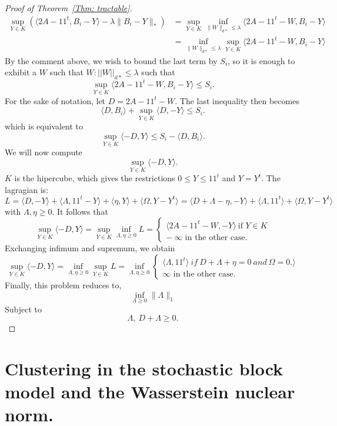 \documentclass[12pt]{amsart}
\theoremstyle{remark}
\begin{document}
\begin{proof}[Proof of Theorem~\ref{Thm: tractable}]
\[
\begin{aligned}
\sup_{Y\in K} \left(\langle 2A-11^t, B_i-Y\rangle -\lambda \|B_i-Y\|_*\right)&=
\sup_{Y\in K} \inf_{ \|W\|_{d*}\leq \lambda} \langle 2A-11^t-W, B_i-Y\rangle \\ 
&=\inf_{ \|W\|_{d*}\leq \lambda}\sup_{Y\in K}\langle 2A-11^t-W, B_i-Y\rangle 
\end{aligned}
\]
By the comment above, we wish to bound the last term by $S_i$, so it is enough to exhibit a $W$ such that $W: ||W||_{d*} \leq \lambda$ such that
\[
\sup_{Y\in K} \langle 2A-11^t-W, B_i-Y\rangle \leq S_i.
\]
For the sake of notation, let 
$D= 2A-11^t-W$.
The last inequality then becomes
\[
\langle D,B_i\rangle + \sup_{Y \in K}\langle D,-Y \rangle \leq S_i.
\]
which is equivalent to 
\[
 \sup_{Y \in K}\langle -D,Y \rangle \leq S_i-\langle D,B_i\rangle.
\]
We will now compute 
\[\sup_{Y \in K}\langle -D,Y \rangle.\]
$K$ is the hipercube, which gives the restrictions $0 \leq Y \leq 11^t$ and $Y=Y^t$. 
The lagragian is: 
\[
L = \langle D,-Y \rangle + \langle \Lambda,11^t-Y \rangle + \langle \eta,Y \rangle + \langle \Omega,Y-Y^t \rangle
= \langle D+\Lambda -\eta,-Y \rangle + \langle \Lambda,11^t\rangle + \langle \Omega, Y-Y^t\rangle\]
with $\Lambda,\eta \geq 0$.
It follows that
\[
\sup_{Y \in K}\langle -D,Y \rangle = \sup_{Y \in K} \inf_{\Lambda,\eta \geq 0} L = \begin{cases}
\langle 2A-11^t-W,-Y \rangle \ \text{if } Y \in K\\
- \ \infty \text{ in the other case.}
\end{cases}
\]
Exchanging infimum and supremum, we obtain  
\[
\sup_{Y \in K}\langle -D,Y \rangle = \inf_{\Lambda,\eta \geq 0}\sup_{Y \in K}L= \inf_{\Lambda,\eta \geq 0} 
\begin{cases}
\langle \Lambda, 11^t \rangle \ if \ D+\Lambda + \eta = 0 \ and \ \Omega =0.\rangle \\
\infty \text{ in the other case.}
\end{cases}
\]
Finally, this problem reduces to, 
\[
\inf_{\Lambda \geq0} \|\Lambda\|_1
\]
Subject to 
\[
\Lambda, \ D+\Lambda \geq 0.
\]




\end{proof}

\section{Clustering in the stochastic block model and the Wasserstein nuclear norm.}
\end{document}
